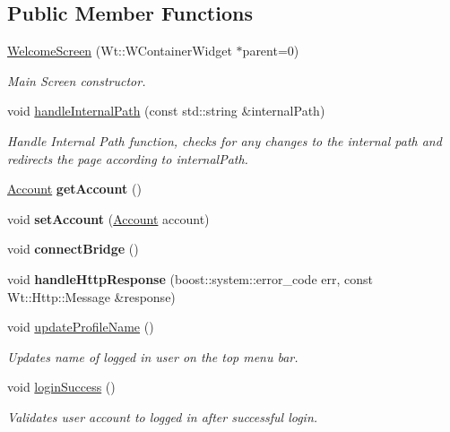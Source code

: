 \subsection*{Public Member Functions}
\begin{DoxyCompactItemize}
\item 
\hyperlink{classWelcomeScreen_a9d614d7c0a65f5f161fdd62016cccb02}{Welcome\+Screen} (Wt\+::\+W\+Container\+Widget $\ast$parent=0)
\begin{DoxyCompactList}\small\item\em Main Screen constructor. \end{DoxyCompactList}\item 
void \hyperlink{classWelcomeScreen_a7301f3941c1ff0caa7045329c71c41a7}{handle\+Internal\+Path} (const std\+::string \&internal\+Path)
\begin{DoxyCompactList}\small\item\em Handle Internal Path function, checks for any changes to the internal path and redirects the page according to internal\+Path. \end{DoxyCompactList}\item 
\hyperlink{classAccount}{Account} {\bfseries get\+Account} ()\hypertarget{classWelcomeScreen_a4cd28472ee9233a9f4d32d4804163e79}{}\label{classWelcomeScreen_a4cd28472ee9233a9f4d32d4804163e79}

\item 
void {\bfseries set\+Account} (\hyperlink{classAccount}{Account} account)\hypertarget{classWelcomeScreen_a087ed7ee3186e47863edb316fba2512d}{}\label{classWelcomeScreen_a087ed7ee3186e47863edb316fba2512d}

\item 
void {\bfseries connect\+Bridge} ()\hypertarget{classWelcomeScreen_a5b212d7e956e08f9a4cfb6ea509e65cc}{}\label{classWelcomeScreen_a5b212d7e956e08f9a4cfb6ea509e65cc}

\item 
void {\bfseries handle\+Http\+Response} (boost\+::system\+::error\+\_\+code err, const Wt\+::\+Http\+::\+Message \&response)\hypertarget{classWelcomeScreen_a83e9eafc251ce2b4e1e844a218aa3a1a}{}\label{classWelcomeScreen_a83e9eafc251ce2b4e1e844a218aa3a1a}

\item 
void \hyperlink{classWelcomeScreen_afd5f059dbc60e31015b1f210f6bc16e0}{update\+Profile\+Name} ()
\begin{DoxyCompactList}\small\item\em Updates name of logged in user on the top menu bar. \end{DoxyCompactList}\item 
void \hyperlink{classWelcomeScreen_abe56adce06150723d19ae52713f4b8cc}{login\+Success} ()
\begin{DoxyCompactList}\small\item\em Validates user account to logged in after successful login. \end{DoxyCompactList}\end{DoxyCompactItemize}
